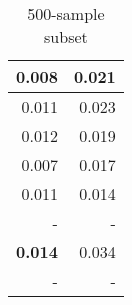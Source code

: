 \begin{table}[ht]
\begin{subtable}{0.19\linewidth}
{\begin{tabular}{rr}
{0.008}   &  {0.021}  \\
\midrule
{0.011}   &  {0.023}  \\
{0.012}   &  {0.019}  \\
\midrule
{0.007}   &  {0.017}  \\
{0.011}   &  {0.014}  \\
\midrule
 - & - \\
\midrule
\textbf{0.014}   &  {0.034}  \\
 - & - \\
\bottomrule
\end{tabular}}
\caption{\label{tab:correl-500-subset}500-sample subset}
\end{subtable}
\end{table}

